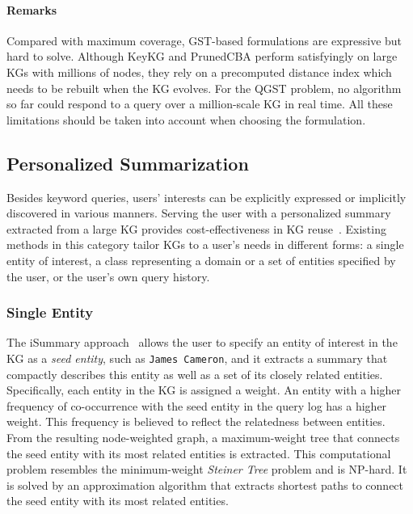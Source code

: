 \paragraph{Remarks}
Compared with maximum coverage, GST-based formulations are expressive but hard to solve. Although KeyKG and PrunedCBA perform satisfyingly on large KGs with millions of nodes, they rely on a precomputed distance index which needs to be rebuilt when the KG evolves. For the QGST problem, no algorithm so far could respond to a query over a million-scale KG in real time. All these limitations should be taken into account when choosing the formulation.

\subsection{Personalized Summarization}

Besides keyword queries, users' interests can be explicitly expressed or implicitly discovered in various manners. Serving the user with a personalized summary extracted from a large KG provides cost-effectiveness in KG reuse~\cite{DBLP:conf/icdm/SafaviBFMMK19,DBLP:conf/esws/VassiliouAPK23}. Existing methods in this category tailor KGs to a user's needs in different forms: a single entity of interest, a class representing a domain or a set of entities specified by the user, or the user's own query history.

\subsubsection{Single Entity}
The iSummary approach~\cite{DBLP:conf/esws/VassiliouAPK23} allows the user to specify an entity of interest in the KG as a \emph{seed entity}, such as \texttt{James Cameron}, and it extracts a summary that compactly describes this entity as well as a set of its closely related entities. Specifically, each entity in the KG is assigned a weight. An entity with a higher frequency of co-occurrence with the seed entity in the query log has a higher weight. This frequency is believed to reflect the relatedness between entities. From the resulting node-weighted graph, a maximum-weight tree that connects the seed entity with its most related entities is extracted. This computational problem resembles the minimum-weight \emph{Steiner Tree} problem and is NP-hard. It is solved by an approximation algorithm that extracts shortest paths to connect the seed entity with its most related entities.

